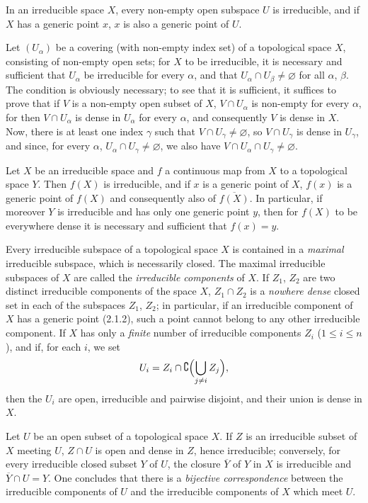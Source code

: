 \begin{env}[2.1.4]
\label{0.2.1.4}
In an irreducible space $X$, every non-empty open subspace $U$ is
irreducible, and if $X$ has a generic point $x$, $x$ is also a generic
point of $U$.

Let $(U_\alpha)$ be a covering (with non-empty index set) of a
topological space $X$, consisting of non-empty open sets; for $X$ to be
irreducible, it is necessary and sufficient that $U_\alpha$ be irreducible for every
$\alpha$, and that $U_\alpha\cap U_\beta\neq\varnothing$ for all
$\alpha$, $\beta$. The condition is obviously necessary; to see that it
is sufficient, it suffices to prove that if $V$ is a non-empty open subset of $X$,
$V\cap U_\alpha$ is non-empty for every $\alpha$, for then $V\cap U_\alpha$
is dense in $U_\alpha$ for every $\alpha$, and consequently $V$ is dense in
$X$. Now, there is at least one index $\gamma$ such that
$V\cap U_\gamma\neq\varnothing$, so $V\cap U_\gamma$ is dense in
$U_\gamma$, and since, for every $\alpha$,
$U_\alpha\cap U_\gamma\neq\varnothing$, we also have
$V\cap U_\alpha\cap U_\gamma\neq\varnothing$.
\end{env}


\begin{env}[2.1.5]
\label{0.2.1.5}
Let $X$ be an irreducible space and $f$ a continuous map from $X$ to a
topological space $Y$. Then $f(X)$ is irreducible, and if $x$ is a
generic point of $X$, $f(x)$ is a generic point of $f(X)$ and consequently also of
$\overline{f(X)}$. In particular, if moreover $Y$ is irreducible and has only one
generic point $y$, then for $f(X)$ to be everywhere dense it is necessary and sufficient
that $f(x)=y$.
\end{env}

\begin{env}[2.1.6]
\label{0.2.1.6}
Every irreducible subspace of a topological space $X$ is contained in a
\emph{maximal} irreducible subspace, which is necessarily closed. The
maximal irreducible subspaces of $X$ are called the \emph{irreducible
components} of $X$. If $Z_1$, $Z_2$ are two distinct irreducible components
of the space $X$, $Z_1\cap Z_2$ is a \emph{nowhere dense} closed set
in each of the subspaces $Z_1$, $Z_2$; in particular, if an irreducible
component of $X$ has a generic point (2.1.2), such a point cannot
belong to any other irreducible component. If $X$ has only a
\emph{finite} number of irreducible components $Z_i$ ($1\leq i\leq n$), and if, for
each $i$, we set
\[
  U_i=Z_i\cap\complement\Bigl(\bigcup_{j\neq i}Z_j\Bigr),
\]
then the $U_i$ are open, irreducible and pairwise disjoint, and their
union is dense in $X$.

Let $U$ be an open subset of a topological space $X$. If $Z$ is an
irreducible subset of $X$ meeting $U$, $Z\cap U$ is open and dense in $Z$,
hence irreducible; conversely, for every irreducible closed subset $Y$ of
$U$, the closure $\overline Y$ of $Y$ in $X$ is irreducible and
$\overline Y\cap U=Y$. One concludes that there is a \emph{bijective
correspondence} between the irreducible components of $U$ and the irreducible
components of $X$ which meet $U$.
\end{env}

